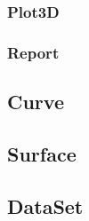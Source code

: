 \subsubsection{Plot3D}


\subsubsection{Report}


\subsection{Curve}


\subsection{Surface}


\subsection{DataSet}


